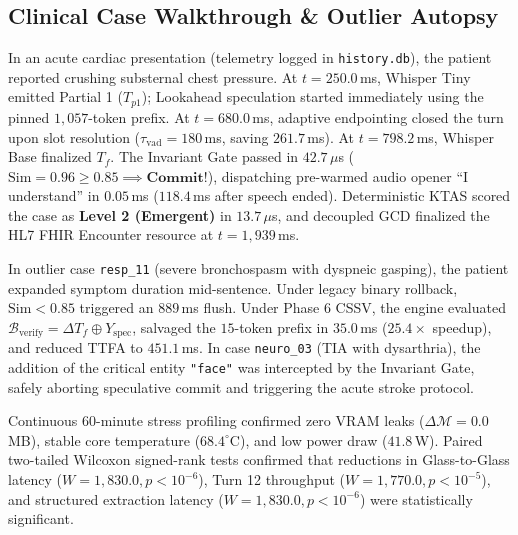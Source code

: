 \documentclass[10pt,journal,compsoc]{IEEEtran}
\begin{document}
\subsection{Clinical Case Walkthrough \& Outlier Autopsy}
In an acute cardiac presentation (telemetry logged in \texttt{history.db}), the patient reported crushing substernal chest pressure. At $t=250.0$\,ms, Whisper Tiny emitted Partial 1 ($T_{p1}$); Lookahead speculation started immediately using the pinned $1{,}057$-token prefix. At $t=680.0$\,ms, adaptive endpointing closed the turn upon
slot resolution ($\tau_{\text{vad}} = 180$\,ms, saving $261.7$\,ms). At $t=798.2$\,ms, Whisper Base finalized $T_f$. The Invariant Gate passed in $42.7\,\mu$s ($\text{Sim} = 0.96 \ge 0.85 \implies \textbf{Commit!}$), dispatching pre-warmed audio opener ``I understand'' in $0.05$\,ms ($118.4$\,ms after speech ended). Deterministic KTAS
scored the case as \textbf{Level 2 (Emergent)} in $13.7\,\mu$s, and decoupled GCD finalized the HL7 FHIR Encounter resource at $t=1{,}939$\,ms.

In outlier case \texttt{resp\_11} (severe bronchospasm with dyspneic gasping), the patient expanded symptom duration mid-sentence. Under legacy binary rollback, $\text{Sim} < 0.85$ triggered an $889$\,ms flush. Under Phase 6 CSSV, the engine evaluated $\mathcal{B}_{\text{verify}} = \Delta T_f \oplus Y_{\text{spec}}$, salvaged the
$15$-token prefix in $35.0$\,ms ($25.4\times$ speedup), and reduced TTFA to $451.1$\,ms. In case \texttt{neuro\_03} (TIA with dysarthria), the addition of the critical entity \texttt{"face"} was intercepted by the Invariant Gate, safely aborting speculative commit and triggering the acute stroke protocol.

Continuous 60-minute stress profiling confirmed zero VRAM leaks ($\Delta \mathcal{M} = 0.0$\,MB), stable core temperature ($68.4^\circ\text{C}$), and low power draw ($41.8$\,W). Paired two-tailed Wilcoxon signed-rank tests confirmed that reductions in Glass-to-Glass latency ($W = 1{,}830.0, p < 10^{-6}$), Turn 12 throughput ($W =
1{,}770.0, p < 10^{-5}$), and structured extraction latency ($W = 1{,}830.0, p < 10^{-6}$) were statistically significant.
\end{document}
